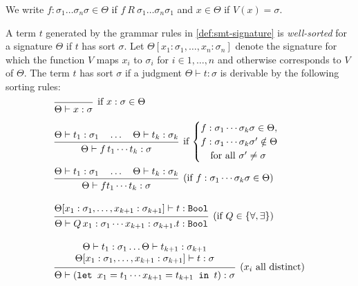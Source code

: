 \begin{notation}
We write $f: \sigma_1\dots\sigma_n\sigma \in \Theta$ if $f~R~\sigma_1 \dots \sigma_n \sigma_1$ and $x \in \Theta$ if $V(x) = \sigma$.
\end{notation}

\begin{definition}
A term $t$ generated by the grammar rules in \cref{def:smt-signature} is \emph{well-sorted} for a signature $\Theta$ if $t$ has sort $\sigma$.  
Let $\Theta[x_1 : \sigma_1, \dots, x_n : \sigma_n]$ denote the signature for which the function $V$ maps $x_i$ to $\sigma_i$ for $i \in 1,\dots,n$ and otherwise corresponds to $V$ of $\Theta$.  
The term $t$ has sort $\sigma$ if a judgment $\Theta \vdash t : \sigma$ is derivable by the following sorting rules:
\[
\begin{array}{l}
\begin{prooftree}
\infer0[if~$x : \sigma \in \Theta$]{\Theta \vdash x : \sigma}
\end{prooftree}
\\[2em]
\begin{prooftree}
\hypo{\Theta \vdash t_1 : \sigma_1 \quad \dots \quad \Theta \vdash t_k : \sigma_k}
\infer1[if $\begin{cases} f : \sigma_1 \cdots \sigma_k \sigma \in \Theta, \\ f : \sigma_1 \cdots \sigma_k \sigma' \notin \Theta\\ \quad \text{for all } \sigma' \neq \sigma \end{cases}$]{\Theta \vdash f\, t_1 \cdots t_k : \sigma}
\end{prooftree}
\\[2em]
\begin{prooftree}
\hypo{\Theta \vdash t_1 : \sigma_1 \quad \dots \quad \Theta \vdash t_k : \sigma_k}
\infer1[(if $f : \sigma_1 \cdots \sigma_k \sigma \in \Theta$)]{\Theta \vdash f t_1 \cdots t_k : \sigma}
\end{prooftree}
\\[2em]
\begin{prooftree}
\hypo{\Theta[x_1 : \sigma_1, \dots, x_{k+1} : \sigma_{k+1}] \vdash t : \kw{Bool}}
\infer1[(if $Q \in \{\forall, \exists\}$)]{\Theta \vdash Q\, x_1 : \sigma_1 \cdots x_{k+1} : \sigma_{k+1} . t : \kw{Bool}}
\end{prooftree}
\\[2em]
\begin{prooftree}
\hypo{
  \begin{matrix}
    \Theta \vdash t_1 : \sigma_1 \dots  \Theta \vdash t_{k+1} : \sigma_{k+1}  \\
    \Theta[x_1 : \sigma_1, \dots, x_{k+1} : \sigma_{k+1}] \vdash t : \sigma
  \end{matrix}
}
\infer1[($x_i$ all distinct)]{\Theta \vdash (\kw{let } x_1 = t_1 \cdots x_{k+1} = t_{k+1} \kw{ in } t) : \sigma}
\end{prooftree}
\end{array}
\]
\end{definition}


